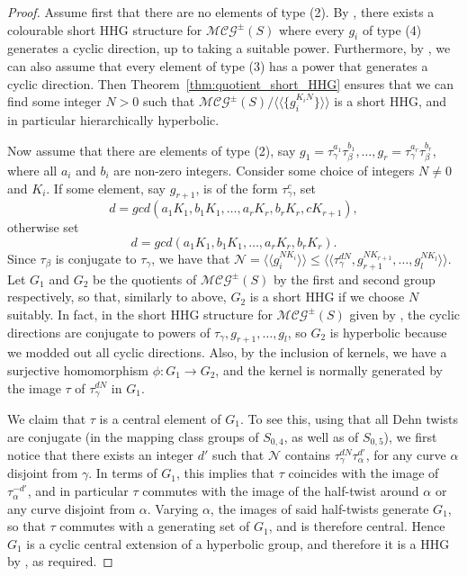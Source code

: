\documentclass[svgnames]{amsart}
\theoremstyle{plain}
\theoremstyle{definition}
\newcommand{\MCG}{\mathcal{MCG}^\pm}
\begin{document}
\begin{proof}
Assume first that there are no elements of type (2). By \cite[Proposition~5.1]{Short_HHG:I}, there exists a colourable short HHG structure for $\MCG(S)$ where every $g_i$ of type (4) generates a cyclic direction, up to taking a suitable power. Furthermore, by \cite[Proposition 5.2]{Short_HHG:I}, we can also assume that every element of type (3) has a power that generates a cyclic direction. Then Theorem~\ref{thm:quotient_short_HHG} ensures that we can find some integer $N>0$ such that $\MCG(S)/\langle\langle \{g_i^{K_i N}\}\rangle\rangle$ is a short HHG, and in particular hierarchically hyperbolic.
\par\medskip
    Now assume that there are elements of type (2), say $g_1=\tau_\gamma^{a_1}\tau_\beta^{b_1}, \ldots, g_r=\tau_\gamma^{a_r}\tau_\beta^{b_r}$, where all $a_i$ and $b_i$ are non-zero integers. Consider some choice of integers $N\neq 0$ and $K_i$. If some element, say $g_{r+1}$, is of the form $\tau_\gamma^c$, set $$d=gcd(a_1K_1,b_1K_1,\ldots, a_rK_r,b_rK_r,cK_{r+1}),$$ otherwise set $$d=gcd(a_1K_1,b_1K_1,\ldots, a_rK_r,b_rK_r).$$ Since $\tau_\beta$ is conjugate to $\tau_\gamma$, we have that $\mathcal N=\langle\langle g_i^{N K_i}\rangle\rangle \le \langle\langle \tau_\gamma^{dN}, g_{r+1}^{NK_{r+1}},\dots,g_l^{NK_l}\rangle\rangle$. Let $G_1$ and $G_2$ be the quotients of $\MCG(S)$ by the first and second group respectively, so that, similarly to above, $G_2$ is a short HHG if we choose $N$ suitably. In fact, in the short HHG structure for $\MCG(S)$ given by \cite[Propositions 5.1 and 5.2]{Short_HHG:I}, the cyclic directions are conjugate to powers of $\tau_\gamma, g_{r+1},\dots,g_l$, so $G_2$ is hyperbolic because we modded out all cyclic directions. Also, by the inclusion of kernels, we have a surjective homomorphism $\phi\colon G_1\to G_2$, and the kernel is normally generated by the image $\tau$ of $\tau_\gamma^{dN}$ in $G_1$. 
\par\medskip
We claim that $\tau$ is a central element of $G_1$. To see this, using that all Dehn twists are conjugate (in the mapping class groups of $S_{0,4}$, as well as of $S_{0,5}$), we first notice that there exists an integer $d'$ such that $\mathcal N$ contains $\tau_\gamma^{dN}\tau^{d'}_\alpha$, for any curve $\alpha$ disjoint from $\gamma$. In terms of $G_1$, this implies that $\tau$ coincides with the image of $\tau^{-d'}_\alpha$, and in particular $\tau$ commutes with the image of the half-twist around $\alpha$ or any curve disjoint from $\alpha$. Varying $\alpha$, the images of said half-twists generate $G_1$, so that $\tau$ commutes with a generating set of $G_1$, and is therefore central. 
Hence $G_1$ is a cyclic central extension of a hyperbolic group, and therefore it is a HHG by \cite[Corollary 4.3]{HRSS_3manifold}, as required.
\end{proof}
\end{document}
